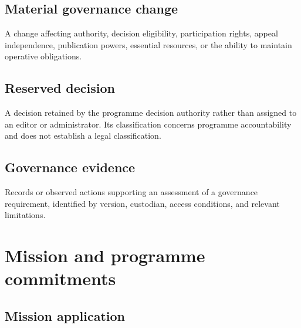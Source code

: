 \documentclass[11pt,a4paper]{article}
\begin{document}
\subsection{Material governance change}
A change affecting authority, decision eligibility, participation rights, appeal independence, publication powers, essential resources, or the ability to maintain operative obligations.

\subsection{Reserved decision}
A decision retained by the programme decision authority rather than assigned to an editor or administrator. Its classification concerns programme accountability and does not establish a legal classification.

\subsection{Governance evidence}
Records or observed actions supporting an assessment of a governance requirement, identified by version, custodian, access conditions, and relevant limitations.

\section{Mission and programme commitments}
\subsection{Mission application}
\end{document}
